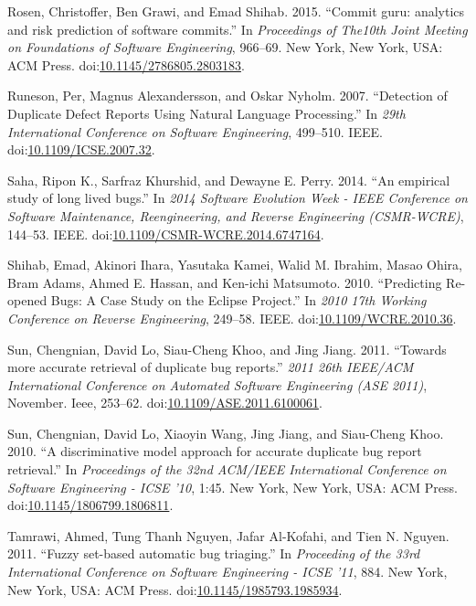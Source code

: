 \documentclass[natbib]{svjour3}
\begin{document}
\hypertarget{ref-Rosen2015}{}
Rosen, Christoffer, Ben Grawi, and Emad Shihab. 2015. ``Commit guru:
analytics and risk prediction of software commits.'' In
\emph{Proceedings of The10th Joint Meeting on Foundations of Software
Engineering}, 966--69. New York, New York, USA: ACM Press.
doi:\href{https://doi.org/10.1145/2786805.2803183}{10.1145/2786805.2803183}.

\hypertarget{ref-Runeson2007}{}
Runeson, Per, Magnus Alexandersson, and Oskar Nyholm. 2007. ``Detection
of Duplicate Defect Reports Using Natural Language Processing.'' In
\emph{29th International Conference on Software Engineering}, 499--510.
IEEE.
doi:\href{https://doi.org/10.1109/ICSE.2007.32}{10.1109/ICSE.2007.32}.

\hypertarget{ref-Saha2014}{}
Saha, Ripon K., Sarfraz Khurshid, and Dewayne E. Perry. 2014. ``An
empirical study of long lived bugs.'' In \emph{2014 Software Evolution
Week - IEEE Conference on Software Maintenance, Reengineering, and
Reverse Engineering (CSMR-WCRE)}, 144--53. IEEE.
doi:\href{https://doi.org/10.1109/CSMR-WCRE.2014.6747164}{10.1109/CSMR-WCRE.2014.6747164}.

\hypertarget{ref-Shihab2010}{}
Shihab, Emad, Akinori Ihara, Yasutaka Kamei, Walid M. Ibrahim, Masao
Ohira, Bram Adams, Ahmed E. Hassan, and Ken-ichi Matsumoto. 2010.
``Predicting Re-opened Bugs: A Case Study on the Eclipse Project.'' In
\emph{2010 17th Working Conference on Reverse Engineering}, 249--58.
IEEE.
doi:\href{https://doi.org/10.1109/WCRE.2010.36}{10.1109/WCRE.2010.36}.

\hypertarget{ref-Sun2011}{}
Sun, Chengnian, David Lo, Siau-Cheng Khoo, and Jing Jiang. 2011.
``Towards more accurate retrieval of duplicate bug reports.'' \emph{2011
26th IEEE/ACM International Conference on Automated Software Engineering
(ASE 2011)}, November. Ieee, 253--62.
doi:\href{https://doi.org/10.1109/ASE.2011.6100061}{10.1109/ASE.2011.6100061}.

\hypertarget{ref-Sun2010}{}
Sun, Chengnian, David Lo, Xiaoyin Wang, Jing Jiang, and Siau-Cheng Khoo.
2010. ``A discriminative model approach for accurate duplicate bug
report retrieval.'' In \emph{Proceedings of the 32nd ACM/IEEE
International Conference on Software Engineering - ICSE '10}, 1:45. New
York, New York, USA: ACM Press.
doi:\href{https://doi.org/10.1145/1806799.1806811}{10.1145/1806799.1806811}.

\hypertarget{ref-Tamrawi2011a}{}
Tamrawi, Ahmed, Tung Thanh Nguyen, Jafar Al-Kofahi, and Tien N. Nguyen.
2011. ``Fuzzy set-based automatic bug triaging.'' In \emph{Proceeding of
the 33rd International Conference on Software Engineering - ICSE '11},
884. New York, New York, USA: ACM Press.
doi:\href{https://doi.org/10.1145/1985793.1985934}{10.1145/1985793.1985934}.
\end{document}
